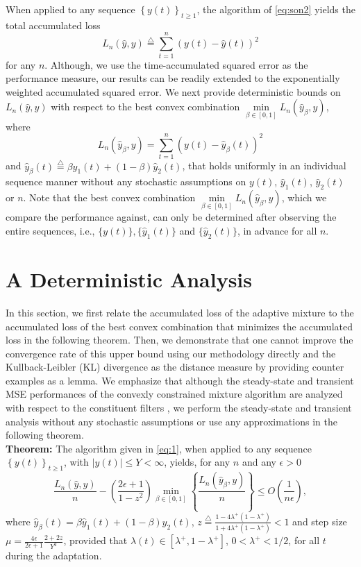 \documentclass[journal]{IEEEtran}
\newcommand{\sy}{\left\{y(t)\right\}_{t \geq 1}}
\newcommand{\defi}{\stackrel{\bigtriangleup}{=}}
\begin{document}
When applied to any sequence $\sy$, the algorithm of \eqref{eq:son2}
yields the total accumulated loss
\[
L_n(\hat{y},y) \defi \sum_{t=1}^n
(y(t)-\hat{y}(t))^2
\]\normalsize
for any $n$. Although, we use the time-accumulated squared error as
the performance measure, our results can be readily extended to
the exponentially weighted accumulated squared error. We next provide deterministic bounds on $L_n(\hat{y},y)$ with respect to the best convex combination $
\min\limits_{\beta\in[0,1]} L_n(\hat{y}_{\beta},y)$, where
\[
 L_n(\hat{y}_{\beta},y) = \sum_{t=1}^n (y(t)-\hat{y}_{\beta}(t))^2
\]
and $\hat{y}_{\beta}(t)\defi\beta \hat{y}_1(t)+(1-\beta)\hat{y}_2(t)$,
that holds uniformly in an individual sequence manner without any
stochastic assumptions on $y(t)$, $\hat{y}_1(t)$, $\hat{y}_2(t)$ or
$n$. Note that the best convex combination $
\min\limits_{\beta\in[0,1]} L_n(\hat{y}_{\beta},y)$, which we compare
the performance against,
can only be determined after observing the entire sequences, i.e.,
$\{y(t)\},\{\hat{y}_1(t)\}$ and $\{\hat{y}_2(t)\}$, in advance for all $n$.

\section{A Deterministic Analysis \label{sec:deterministic_analysis}}

In this section, we first relate the accumulated loss of the adaptive
mixture to the accumulated loss of the best convex combination that
minimizes the accumulated loss in the following theorem. Then, we
demonstrate that one cannot improve the convergence rate of this upper
bound using our methodology directly and the Kullback-Leibler (KL)
divergence \cite{KiWa02} as the distance measure by providing counter
examples as a lemma. We emphasize that although the steady-state and
transient MSE performances of the convexly constrained mixture
algorithm are analyzed with respect to the constituent filters
\cite{convex,tranconv,kozat}, we perform the steady-state and
transient analysis without any stochastic assumptions or use any
approximations in the following theorem.\\

\noindent
{\bf Theorem:} The algorithm given in \eqref{eq:1}, when applied to
any sequence $\sy$, with $|y(t)| \leq Y<\infty$, yields, for any $n$
and any $\epsilon > 0$
\begin{equation}
\frac{L_n(\hat{y},y)}{n}-\left( \frac{2 \epsilon+1}{1-z^2}\right) \min\limits_{\beta\in[0,1]} \left\{ \frac{L_n(\hat{y}_{\beta},y)}{n}\right\} \leq O\left( \frac{1}{n\epsilon} \right), \label{eq:theorem}
\end{equation}\normalsize
where $\hat{y}_{\beta}(t)=\beta \hat{y}_1(t)+(1-\beta)\hat{y}_2(t)$, $z\defi \frac{1-4 \lambda^+(1-\lambda^+)}{1+4
  \lambda^+(1-\lambda^+)} < 1$ and step size $\mu = \frac{4
  \epsilon}{2\epsilon+1}\frac{2+2z}{Y^2}$, provided that $\lambda(t)
\in \left[\lambda^+ , 1-\lambda^+\right]$, $0 < \lambda^+ < 1/2$, for all
$t$ during the adaptation. \\
\end{document}
